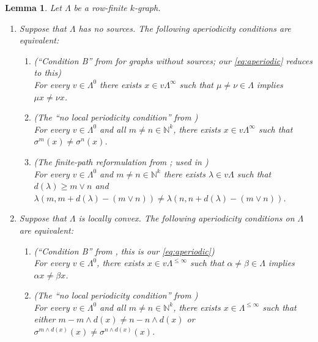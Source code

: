 \documentclass[a4paper,12pt]{amsart}
\numberwithin{equation}{section}
\newtheorem{lemma}[thm]{Lemma}
\theoremstyle{definition}
\theoremstyle{remark}
\begin{document}
\begin{lemma}\label{lem-pain} Let $\Lambda$ be a  row-finite $k$-graph.\begin{enumerate} 
\item\label{paina} Suppose that $\Lambda$ has no sources. The following aperiodicity conditions  are equivalent:
\begin{enumerate}

\item\label{itemii} \textup{(``Condition B'' from \cite[Theorem~4.3]{RSY03} for graphs without sources; our \eqref{eq:aperiodic} reduces to this)}\\
For every $v\in\Lambda^0$ there exists $x\in v\Lambda^\infty$ such that $\mu\neq \nu\in \Lambda$ implies $\mu x\neq \nu x$.
\item \textup{(The ``no local periodicity condition'' from \cite[Lemma~3.2(iii)]{RS2007})}\\
For every $v\in \Lambda^0$ and all $m\neq n\in{\mathbb{N}}^k$, there exists $x\in v\Lambda^\infty$ such that $\sigma^m(x)\neq\sigma^n(x)$.

\item\label{itemiii} \textup{(The finite-path reformulation from \cite[Lemma~3.2(iv)]{RS2007}; used in \cite{ACaHR})}\\ For every $v\in \Lambda^0$ and $m\neq n\in {\mathbb N}^k$ there exists $\lambda\in v\Lambda$ such that
$d(\lambda)\geq m\vee n$ and 
$
\lambda(m,m+d(\lambda)-(m\vee n))\neq \lambda(n,n+d(\lambda)-(m\vee n))
$.
\end{enumerate}
\item\label{painb}
Suppose that $\Lambda$ is locally convex. The following aperiodicity conditions on $\Lambda$ are equivalent:
\begin{enumerate}
\item \textup{(``Condition B''  from \cite[Theorem~4.3]{RSY03}, this is our \eqref{eq:aperiodic})}\\
For every $v \in \Lambda^0$, there exists  $x \in v\Lambda^{\leq \infty}$
such that $\alpha \neq \beta\in\Lambda$  implies $\alpha x \neq \beta x$.
\item \textup{(The ``no local periodicity condition'' from \cite[Definition~3.2]{RS2009})}\\
For every $v\in\Lambda^0$ and all $m\neq n\in{\mathbb{N}}^k$, there exists $x\in\Lambda^{\leq \infty}$ such that either $m-m\wedge d(x)\neq n-n\wedge d(x)$ or $\sigma^{m\wedge d(x)}(x)\neq \sigma^{n\wedge d(x)}(x)$. 
\end{enumerate}
\end{enumerate}
\end{lemma}
\end{document}
